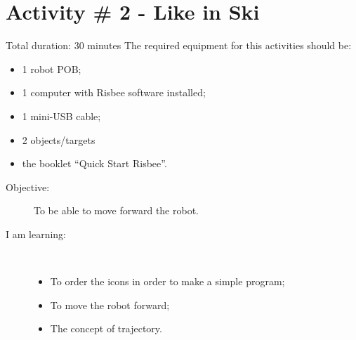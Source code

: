 \section{Activity \# 2 - Like in Ski}


Total duration: 30 minutes
The required equipment for this activities should be:
\begin{itemize}
\item 1 robot POB;
\item 1 computer with Risbee software installed;
\item 1 mini-USB cable;
\item 2 objects/targets
\item the booklet ``Quick Start Risbee''.
\end{itemize}
\frameboxend

\begin{description}
\item[Objective:] To be able to move forward the robot.
\item[I am learning:] \hfill \\ \vspace{-4ex}
  \begin{itemize}
  \item To order the icons in order to make a simple program;
  \item To move the robot forward;
  \item The concept of trajectory.
  \end{itemize}
\end{description}
\frameboxend

